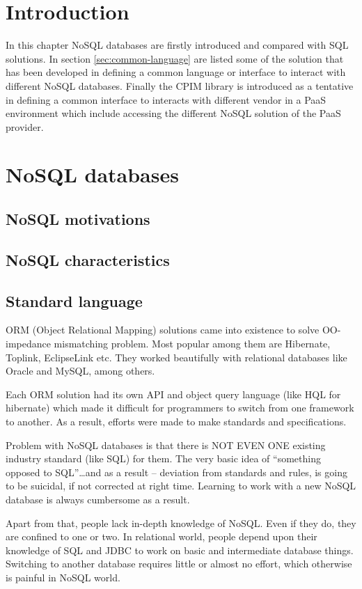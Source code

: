 \section{Introduction}
In this chapter NoSQL databases are firstly introduced and compared with SQL solutions. In section \ref{sec:common-language} are listed some of the solution that has been developed in defining a common language or interface to interact with different NoSQL databases.
\noindent Finally the CPIM library is introduced as a tentative in defining a common interface to interacts with different vendor in a PaaS environment which include accessing the different NoSQL solution of the PaaS provider.

\section{NoSQL databases}
\subsection{NoSQL motivations}
\subsection{NoSQL characteristics}
\subsection{Standard language}
ORM (Object Relational Mapping) solutions came into existence to solve OO-impedance mismatching problem. Most popular among them are Hibernate, Toplink, EclipseLink etc. They worked beautifully with relational databases like Oracle and MySQL, among others.

Each ORM solution had its own API and object query language (like HQL for hibernate) which made it difficult for programmers to switch from one framework to another. As a result, efforts were made to make standards and specifications. 

Problem with NoSQL databases is that there is NOT EVEN ONE existing industry standard (like SQL) for them. The very basic idea of “something opposed to SQL”…and as a result – deviation from standards and rules, is going to be suicidal, if not corrected at right time. Learning to work with a new NoSQL database is always cumbersome as a result.

Apart from that, people lack in-depth knowledge of NoSQL. Even if they do, they are confined to one or two. In relational world, people depend upon their knowledge of SQL and JDBC to work on basic and intermediate database things. Switching to another database requires little or almost no effort, which otherwise is painful in NoSQL  world.

